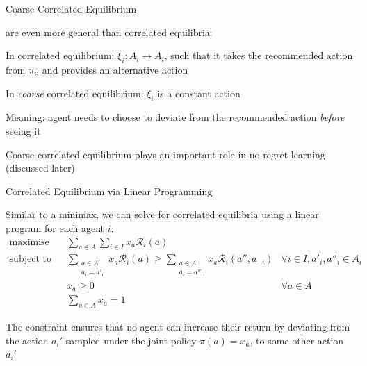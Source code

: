 \begin{frame}{Coarse Correlated Equilibrium}

 are even more general than correlated equilibria:

\blist
    \item In correlated equilibrium: \(\xi_i: A_i \to A_i\), such that it takes the recommended action from $\pi_c$ and provides an alternative action
    \item In {\it coarse} correlated equilibrium: \(\xi_i\) is a constant action
    \item Meaning: agent needs to choose to deviate from the recommended action {\it before} seeing it
    \item Coarse correlated equilibrium plays an important role in no-regret learning (discussed later)
\elist
    
\end{frame}

\begin{frame}{Correlated Equilibrium via Linear Programming}

Similar to a minimax, we can solve for correlated equilibria using a linear program for each agent \(i\):
\vspace{2pt}
\begin{align*}
\text{maximise} \quad & \sum_{a \in A} \sum_{i \in I} x_a \mathcal{R}_i(a) \\
\text{subject to} \quad & \sum_{\substack{a \in A \\ a_i=a'_i}} x_a \mathcal{R}_i(a) \geq \sum_{\substack{a \in A \\ a_i=a''_i}} x_a \mathcal{R}_i(a'', a_{-i}) & \forall i \in I, a'_i, a''_i \in A_i \\
& x_a \geq 0 & \forall a \in A \\
& \sum_{a \in A} x_a = 1
\end{align*}

\blist
    \item The constraint ensures that no agent can increase their return by deviating from the action \(a_{i}'\) sampled under the joint policy \(\pi(a) = x_a\), to some other action \(a_{i}'\)
\elist
\end{frame}


